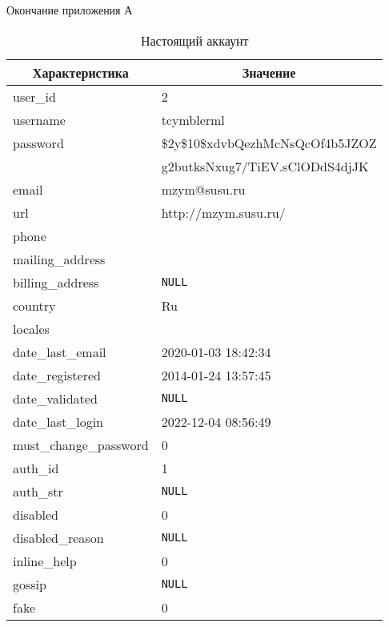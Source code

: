 \newpage
\begin{flushright}
Окончание приложения А 
\end{flushright}
\vspace{-1.5em}

\begin{table}[h]
    \caption{Настоящий аккаунт}
    \vspace{1em}
    \label{tabular:realAccounts}
    \fontsize{12}
    \selectfont
    \begin{tabular}{|l|l|}
    \hline
    \multicolumn{1}{|c|}{\textbf{Характеристика}} & 
    \multicolumn{1}{c|}{\textbf{Значение}}\\ \hline
        user\_id & 2 \\
        username & tcymblerml \\
        password & \$2y\$10\$xdvbQezhMcNsQcOf4b5JZOZ \\
        \newline & g2butksNxug7/TiEV.sClODdS4djJK \\
        email & mzym@susu.ru \\
        url & http://mzym.susu.ru/ \\
        phone &  \\
        mailing\_address &  \\
        billing\_address & \texttt{NULL} \\
        country & Ru \\
        locales &  \\
        date\_last\_email & 2020-01-03 18:42:34 \\
        date\_registered & 2014-01-24 13:57:45 \\
        date\_validated & \texttt{NULL}  \\
        date\_last\_login & 2022-12-04 08:56:49 \\
        must\_change\_password & 0 \\
        auth\_id & 1 \\
        auth\_str & \texttt{NULL}  \\
        disabled & 0 \\
        disabled\_reason & \texttt{NULL}  \\
        inline\_help & 0 \\
        gossip & \texttt{NULL}  \\
        fake & 0 \\
        \hline
    \end{tabular}
\end{table}



